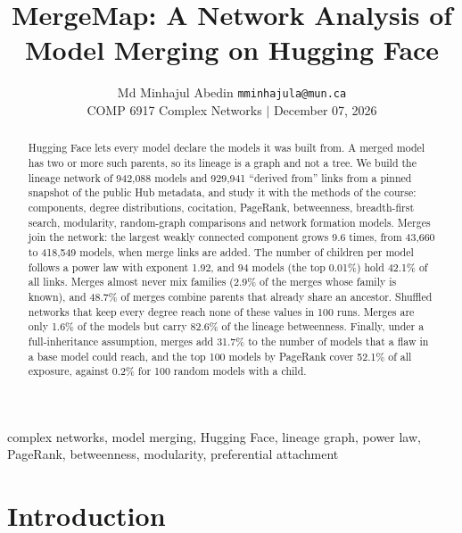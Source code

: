 \documentclass[conference]{IEEEtran}
\begin{document}
\title{MergeMap: A Network Analysis of\\Model Merging on Hugging Face}

\author{\normalsize Md Minhajul Abedin \texttt{mminhajula@mun.ca}\\
COMP 6917 Complex Networks \quad $|$ \quad December 07, 2026}

\maketitle

\begin{abstract}
Hugging Face lets every model declare the models it was built from. A merged
model has two or more such parents, so its lineage is a graph and not a tree.
We build the lineage network of 942,088 models and 929,941 ``derived from''
links from a pinned snapshot of the public Hub metadata, and study it with the
methods of the course: components, degree distributions, cocitation, PageRank,
betweenness, breadth-first search, modularity, random-graph comparisons and
network formation models. Merges join the network: the largest weakly
connected component grows 9.6 times, from 43,660 to 418,549 models, when merge
links are added. The number of children per model follows a power law with
exponent 1.92, and 94 models (the top 0.01\%) hold 42.1\% of all links. Merges
almost never mix families (2.9\% of the merges whose family is known), and 48.7\%
of merges combine parents that already share an ancestor. Shuffled networks
that keep every degree reach none of these values in 100 runs. Merges are only
1.6\% of the models but carry 82.6\% of the lineage betweenness. Finally, under a
full-inheritance assumption, merges add 31.7\% to the number of models that a
flaw in a base model could reach, and the top 100 models by PageRank cover
52.1\% of all exposure, against 0.2\% for 100 random models with a child.
\end{abstract}

\begin{IEEEkeywords}
complex networks, model merging, Hugging Face, lineage graph, power law,
PageRank, betweenness, modularity, preferential attachment
\end{IEEEkeywords}

\section{Introduction}
\end{document}

